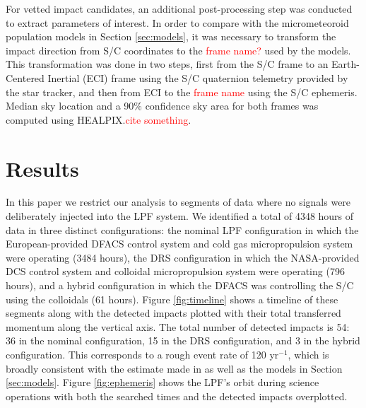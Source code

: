 \documentclass[twocolumn, trackchanges]{aastex62}
\newcommand{\red}[1]{\textcolor{red}{#1}}
\newcommand{\nhours}{4348 }
\begin{document}
For vetted impact candidates, an additional post-processing step was conducted to extract parameters of interest.  In order to compare with the micrometeoroid population models in Section \ref{sec:models}, it was necessary to transform the impact direction from S/C coordinates to the \red{frame name?} used by the models.  This transformation was done in two steps, first from the S/C frame to an Earth-Centered Inertial (ECI) frame using the S/C quaternion telemetry provided by the star tracker, and then from ECI to the \red{frame name} using the S/C ephemeris. Median sky location and a 90\% confidence sky area for both frames was computed using HEALPIX.\red{cite something}.

\section{Results} \label{sec:results}
In this paper we restrict our analysis to segments of data where no signals were deliberately injected into the LPF system. We identified a total of \nhours hours of data in three distinct configurations: the nominal LPF configuration in which the European-provided DFACS control system and cold gas micropropulsion system were operating (3484 hours), the DRS configuration in which the NASA-provided DCS control system and colloidal micropropulsion system were operating (796 hours), and a hybrid configuration in which the DFACS was controlling the S/C using the colloidals (61 hours). Figure \ref{fig:timeline} shows a timeline of these segments along with the detected impacts plotted with their total transferred momentum along the vertical axis. The total number of detected impacts is 54: 36 in the nominal configuration, 15 in the DRS configuration, and 3 in the hybrid configuration. This corresponds to a rough event rate of 120 yr$^{-1}$, which is broadly consistent with the estimate made in \cite{Thorpe:2015cxa} as well as the models in Section \ref{sec:models}.  Figure \ref{fig:ephemeris} shows the LPF's orbit during science operations with both the searched times and the detected impacts overplotted.
\end{document}

